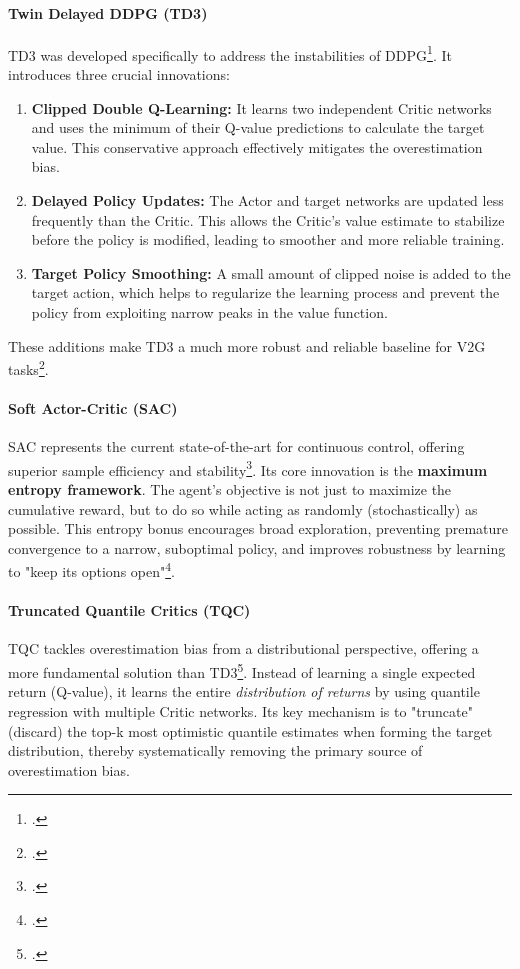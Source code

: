 \paragraph{Twin Delayed DDPG (TD3)}
TD3 was developed specifically to address the instabilities of DDPG\footcite{fujimoto2018addressing}. It introduces three crucial innovations:
\begin{enumerate}
    \item \textbf{Clipped Double Q-Learning:} It learns two independent Critic networks and uses the minimum of their Q-value predictions to calculate the target value. This conservative approach effectively mitigates the overestimation bias.
    \item \textbf{Delayed Policy Updates:} The Actor and target networks are updated less frequently than the Critic. This allows the Critic's value estimate to stabilize before the policy is modified, leading to smoother and more reliable training.
    \item \textbf{Target Policy Smoothing:} A small amount of clipped noise is added to the target action, which helps to regularize the learning process and prevent the policy from exploiting narrow peaks in the value function.
\end{enumerate}
These additions make TD3 a much more robust and reliable baseline for V2G tasks\footcite{liu2023optimal, wang2022multi}.

\paragraph{Soft Actor-Critic (SAC)}
SAC represents the current state-of-the-art for continuous control, offering superior sample efficiency and stability\footcite{haarnoja2018soft}. Its core innovation is the \textbf{maximum entropy framework}. The agent's objective is not just to maximize the cumulative reward, but to do so while acting as randomly (stochastically) as possible. This entropy bonus encourages broad exploration, preventing premature convergence to a narrow, suboptimal policy, and improves robustness by learning to "keep its options open"\footcite{logeshwaran2022comparative}.

\paragraph{Truncated Quantile Critics (TQC)}
TQC tackles overestimation bias from a distributional perspective, offering a more fundamental solution than TD3\footcite{kuznetsov2020controlling}. Instead of learning a single expected return (Q-value), it learns the entire \textit{distribution of returns} by using quantile regression with multiple Critic networks. Its key mechanism is to "truncate" (discard) the top-k most optimistic quantile estimates when forming the target distribution, thereby systematically removing the primary source of overestimation bias.

